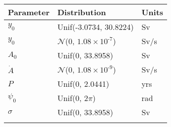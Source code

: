 \begin{tabular}{lll} \hhline{===}
        Parameter & Distribution &  Units\\ \hline
$y_0$ & Unif(\textrm{-}3.0734, 30.8224) & Sv\\
$y_0$ & $\mathcal{N}$(0, ${1.08}\times 10^{\textrm{-}7}$) & Sv/s\\
$A_0$ & Unif(0, 33.8958) & Sv\\
$\dot{A}$ & $\mathcal{N}$(0, ${1.08}\times 10^{\textrm{-}9}$) & Sv/s\\
$P$ & Unif(0, 2.0441) & yrs\\
$\psi_0$ & Unif(0, $2\pi$) & rad\\
$\sigma$ & Unif(0, 33.8958) & Sv\\
\hhline{===}
\end{tabular}